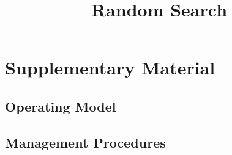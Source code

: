 \documentclass[11pt]{article}
\title{\textbf{Random Search}}
\author{}
\begin{document}
\maketitle

\tableofcontents
\newpage\clearpage


\section{Supplementary Material}

\subsection{Operating Model}




\newpage\clearpage
\subsection{Management Procedures}




\newpage\clearpage\clearpage
 
 
\end{document}
